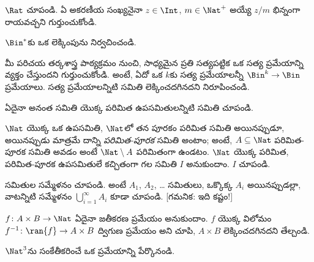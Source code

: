\documentclass[../../../include/open-logic-section]{subfiles}
\begin{document}
\begin{prob}
$\Rat$  చూపండి. ఏ అకరణీయ సంఖ్యనైనా $z \in \Int$,
$m \in \Nat^+$ అయ్యే $z/m$ భిన్నంగా రాయవచ్చని గుర్తుంచుకోండి.
\end{prob}

\begin{prob}
$\Bin^*$కు ఒక లెక్కింపును నిర్వచించండి.
\end{prob}

\begin{prob}
మీ పరిచయ తర్కశాస్త్ర పాఠ్యక్రమం నుంచి, సాధ్యమైన ప్రతి సత్యపట్టిక ఒక
సత్య ప్రమేయాన్ని వ్యక్తం చేస్తుందని గుర్తుంచుకోండి. అంటే, ఏదో ఒక
$k$కు సత్య ప్రమేయాలన్నీ $\Bin^k \to \Bin$ ప్రమేయాలు. సత్య
ప్రమేయాలన్నిటి సమితి లెక్కించదగినదని నిరూపించండి.
\end{prob}

\begin{prob}
ఏదైనా అనంత  సమితి యొక్క పరిమిత ఉపసమితులన్నిటి సమితి
 చూపండి.
\end{prob}

\begin{prob}
$\Nat$ యొక్క ఒక ఉపసమితి, $\Nat$లో తన పూరకం పరిమిత సమితి అయినప్పుడూ, అయినప్పుడు మాత్రమే
దాన్ని \emph{పరిమిత-పూరక} సమితి అంటాం; అంటే, $A \subseteq \Nat$
పరిమిత-పూరక సమితి అవడం అంటే $\Nat\setminus A$ పరిమితంగా ఉండటం.
$\Nat$ యొక్క పరిమిత, పరిమిత-పూరక ఉపసమితులే కచ్చితంగా 
గల సమితి $I$ అనుకుందాం. $I$  చూపండి.
\end{prob}

\begin{prob}
 సమితుల  సమ్మేళనం 
చూపండి. అంటే $A_1$, $A_2$, \dots{} సమితులు, ఒక్కొక్క $A_i$
 అయినప్పుడల్లా, వాటన్నిటి సమ్మేళనం
$\bigcup_{i=1}^\infty A_i$ కూడా  చూపండి.
[గమనిక: ఇది కష్టం!]
\end{prob}

\begin{prob}
$f \colon A \times B \to \Nat$ ఏదైనా జతీకరణ ప్రమేయం అనుకుందాం.
$f$ యొక్క విలోమం $f^{-1}\colon \ran{f}\to A\times B$ ద్విగుణ ప్రమేయం అని చూపి,
$A\times B$ లెక్కించదగినదని తేల్చండి.
\end{prob}

\begin{prob}
$\Nat^3$ను సంకేతీకరించే ఒక ప్రమేయాన్ని పేర్కొనండి.
\end{prob}
\end{document}
